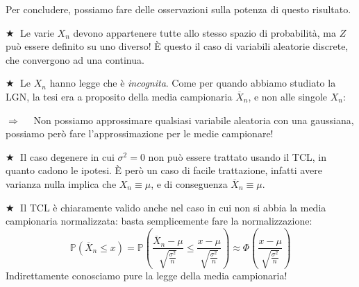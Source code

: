 \bigskip
\noindent Per concludere, possiamo fare delle osservazioni sulla potenza di questo risultato.

\bigskip
\noindent \(\bigstar \;\) Le varie $X_n$ devono appartenere tutte allo stesso spazio di probabilità, ma $Z$ può essere definito su uno diverso! È questo il caso di variabili aleatorie discrete, che convergono ad una continua.

\bigskip
\noindent \(\bigstar \;\) Le $X_n$ hanno legge che è \textit{incognita}. Come per quando abbiamo studiato la LGN, la tesi era a proposito della media campionaria $\overline{X}_{n}$, e non alle singole $X_n$:

\medskip
\(\Rightarrow\quad\) Non possiamo approssimare qualsiasi variabile aleatoria con una gaussiana, possiamo però fare l'approssimazione per le medie campionare!

\begin{figure}[H]
\centering
{}
\end{figure}

\bigskip
\noindent \(\bigstar \;\) Il caso degenere in cui $\sigma^2 = 0$ non può essere trattato usando il TCL, in quanto cadono le ipotesi. È però un caso di facile trattazione, infatti avere varianza nulla implica che $X_n \equiv \mu$, e di conseguenza $\overline{X}_n\equiv \mu$.

\bigskip
\noindent \(\bigstar \;\) Il TCL è chiaramente valido anche nel caso in cui non si abbia la media campionaria normalizzata: basta semplicemente fare la normalizzazione:
\[\mathbb P(\overline{X}_n\leq x) = \mathbb P\left(\frac{\overline{X}_n  - \mu}{\sqrt{\frac{\sigma^2}n}}\leq \frac{x  - \mu}{\sqrt{\frac{\sigma^2}n{}}}\right)\approx \Phi\left(\frac{x  - \mu}{\sqrt{\frac{\sigma^2}n{}}}\right)\]
Indirettamente conosciamo pure la legge della media campionaria!

